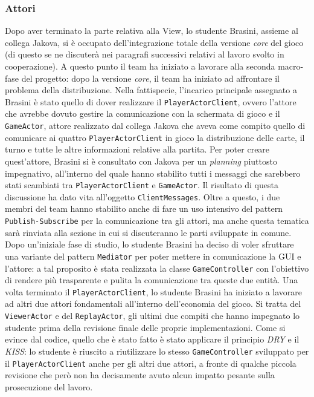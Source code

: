      \clearpage
     
     
      \subsubsection{Attori}\label{subsub:brasini:actors}
     Dopo aver terminato la parte relativa alla View, lo studente Brasini, assieme al collega Jakova, si è occupato dell'integrazione totale della versione \textit{core} del gioco (di questo se ne discuterà nei paragrafi successivi relativi al lavoro svolto in cooperazione). A questo punto il team ha iniziato a lavorare alla seconda macro-fase del progetto: dopo la versione \textit{core}, il team ha iniziato ad affrontare il problema della distribuzione. Nella fattispecie, l'incarico principale assegnato a Brasini è stato quello di dover realizzare il \texttt{PlayerActorClient}, ovvero l'attore che avrebbe dovuto gestire la comunicazione con la schermata di gioco e il \texttt{GameActor}, attore realizzato dal collega Jakova che aveva come compito quello di comunicare ai quattro \texttt{PlayerActorClient} in gioco la distribuzione delle carte, il turno e tutte le altre informazioni relative alla partita. Per poter creare quest'attore, Brasini si è consultato con Jakova per un \textit{planning} piuttosto impegnativo, all'interno del quale hanno stabilito tutti i messaggi che sarebbero stati scambiati tra \texttt{PlayerActorClient} e \texttt{GameActor}. Il risultato di questa discussione ha dato vita all'oggetto \texttt{ClientMessages}. Oltre a questo, i due membri del team hanno stabilito anche di fare un uso intensivo del pattern \texttt{Publish-Subscribe} per la comunicazione tra gli attori, ma anche questa tematica sarà rinviata alla sezione in cui si discuteranno le parti sviluppate in comune. Dopo un'iniziale fase di studio, lo studente Brasini ha deciso di voler sfruttare una variante del pattern \texttt{Mediator} per poter mettere in comunicazione la GUI e l'attore: a tal proposito è stata realizzata la classe \texttt{GameController} con l'obiettivo di rendere più trasparente e pulita la comunicazione tra queste due entità. Una volta terminato il \texttt{PlayerActorClient}, lo studente Brasini ha iniziato a lavorare ad altri due attori fondamentali all'interno dell'economia del gioco. Si tratta del \texttt{ViewerActor} e del \texttt{ReplayActor}, gli ultimi due compiti che hanno impegnato lo studente prima della revisione finale delle proprie implementazioni. Come si evince dal codice, quello che è stato fatto è stato applicare il principio \textit{DRY} e il \textit{KISS}: lo studente è riuscito a riutilizzare lo stesso \texttt{GameController} sviluppato per il \texttt{PlayerActorClient} anche per gli altri due attori, a fronte di qualche piccola revisione che però non ha decisamente avuto alcun impatto pesante sulla prosecuzione del lavoro.
     
